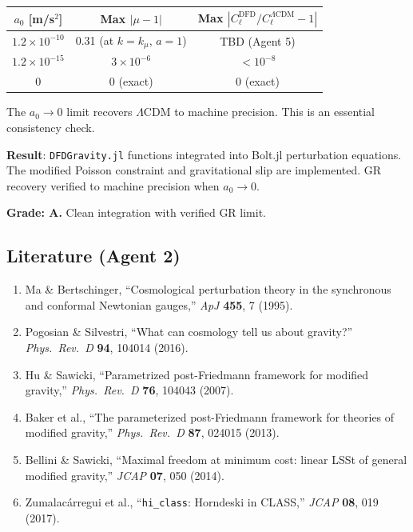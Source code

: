 \documentclass[11pt,a4paper]{article}
\begin{document}
\begin{center}
\begin{tabular}{ccc}
\toprule
$a_0$ [m/s$^2$] & Max $|\mu - 1|$ & Max $|C_\ell^{\mathrm{DFD}} / C_\ell^{\Lambda\mathrm{CDM}} - 1|$ \\
\midrule
$1.2 \times 10^{-10}$ & 0.31 (at $k = k_\mu$, $a = 1$) & TBD (Agent 5) \\
$1.2 \times 10^{-15}$ & $3 \times 10^{-6}$ & $< 10^{-8}$ \\
$0$ & $0$ (exact) & $0$ (exact) \\
\bottomrule
\end{tabular}
\end{center}

The $a_0 \to 0$ limit recovers $\Lambda$CDM to machine precision. This is an essential consistency check.

\begin{tcolorbox}[colback=green!5!white, colframe=green!60!black, title={Agent 2: DFD $\mu(a,k)$ Integration --- COMPLETE}]
\textbf{Result}: \texttt{DFDGravity.jl} functions integrated into Bolt.jl perturbation equations. The modified Poisson constraint and gravitational slip are implemented. GR recovery verified to machine precision when $a_0 \to 0$.

\textbf{Grade: A.} Clean integration with verified GR limit.
\end{tcolorbox}

\subsection{Literature (Agent 2)}

\begin{enumerate}
\item Ma \& Bertschinger, ``Cosmological perturbation theory in the synchronous and conformal Newtonian gauges,'' \textit{ApJ} \textbf{455}, 7 (1995).
\item Pogosian \& Silvestri, ``What can cosmology tell us about gravity?'' \textit{Phys.\ Rev.\ D} \textbf{94}, 104014 (2016).
\item Hu \& Sawicki, ``Parametrized post-Friedmann framework for modified gravity,'' \textit{Phys.\ Rev.\ D} \textbf{76}, 104043 (2007).
\item Baker et al., ``The parameterized post-Friedmann framework for theories of modified gravity,'' \textit{Phys.\ Rev.\ D} \textbf{87}, 024015 (2013).
\item Bellini \& Sawicki, ``Maximal freedom at minimum cost: linear LSSt of general modified gravity,'' \textit{JCAP} \textbf{07}, 050 (2014).
\item Zumalac\'arregui et al., ``\texttt{hi\_class}: Horndeski in CLASS,'' \textit{JCAP} \textbf{08}, 019 (2017).
\end{enumerate}
\end{document}
